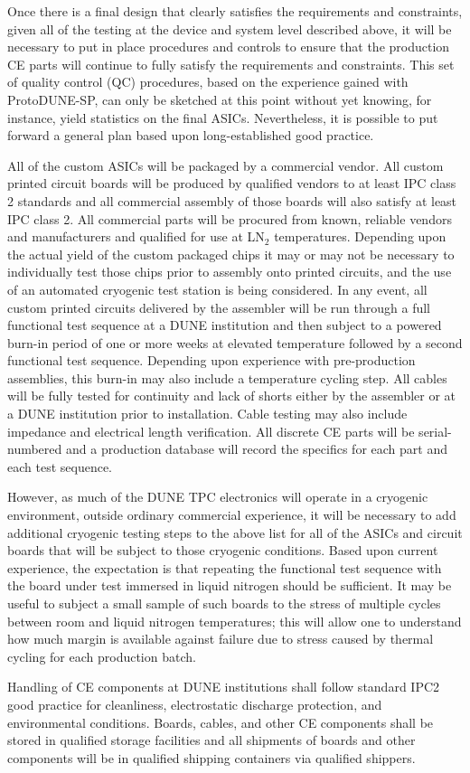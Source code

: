Once there is a final design that clearly satisfies the requirements and constraints, given all of the testing at the device and system level described above, it will be necessary to put in place procedures and controls to ensure that the production CE parts will continue to fully satisfy the requirements and constraints. This set of quality control (QC) procedures, based on the experience gained with ProtoDUNE-SP, can only be sketched at this point without yet knowing, for instance, yield statistics on the final ASICs. Nevertheless, it is possible to put forward a general plan based upon long-established good practice.

All of the custom ASICs will be packaged by a commercial vendor. All custom printed circuit boards will be produced by qualified vendors to at least IPC class 2 standards and all commercial assembly of those boards will also satisfy at least IPC class 2. All commercial parts will be procured from known, reliable vendors and manufacturers and qualified for use at LN$_2$ temperatures. Depending upon the actual yield of the custom packaged chips it may or may not be necessary to individually test those chips prior to assembly onto printed circuits, and the use of an automated cryogenic test station is being considered. In any event, all custom printed circuits delivered by the assembler will be run through a full functional test sequence at a DUNE institution and then subject to a powered burn-in period of one or more weeks at elevated temperature followed by a second functional test sequence. Depending upon experience with pre-production assemblies, this burn-in may also include a temperature cycling step. All cables will be fully tested for continuity and lack of shorts either by the assembler or at a DUNE institution prior to installation. Cable testing may also include impedance and electrical length verification. All discrete CE parts will be serial-numbered and a production database will record the specifics for each part and each test sequence.

However, as much of the DUNE TPC electronics will operate in a cryogenic environment, outside ordinary commercial experience, it will be necessary to add additional cryogenic testing steps to the above list for all of the ASICs and circuit boards that will be subject to those cryogenic conditions. Based upon current experience, the expectation is that repeating the functional test sequence with the board under test immersed in liquid nitrogen should be sufficient. It may be useful to subject a small sample of such boards to the stress of multiple cycles between room and liquid nitrogen temperatures; this will allow one to understand how much margin is available against failure due to stress caused by thermal cycling for each production batch.

Handling of CE components at DUNE institutions shall follow standard IPC2 good practice for cleanliness, electrostatic discharge protection, and environmental conditions. Boards, cables, and other CE components shall be stored in qualified storage facilities and all shipments of boards and other components will be in qualified shipping containers via qualified shippers.
